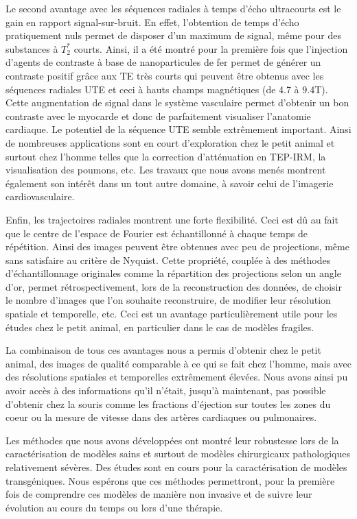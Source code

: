 Le second avantage avec les séquences radiales à temps d'écho ultracourts est le gain en rapport signal-sur-bruit. En effet, l'obtention de temps d'écho pratiquement nuls permet de disposer d'un maximum de signal, même pour des substances à $T_2^*$ courts.
Ainsi, il a été montré pour la première fois que l'injection d'agents de contraste à base de nanoparticules de fer permet de générer un contraste positif grâce aux TE très courts qui peuvent être obtenus avec les séquences radiales UTE et ceci à hauts champs magnétiques (de 4.7 à 9.4T). Cette augmentation de signal dans le système vasculaire permet d'obtenir un bon contraste avec le myocarde et donc de parfaitement visualiser l'anatomie cardiaque. 
Le potentiel de la séquence UTE semble extrêmement important. Ainsi de nombreuses applications sont en court d'exploration chez le petit animal et surtout chez l'homme telles que la correction d'atténuation en TEP-IRM, la visualisation des poumons, etc. Les travaux que nous avons menés montrent également son intérêt dans un tout autre domaine, à savoir celui de l'imagerie cardiovasculaire.

Enfin, les trajectoires radiales montrent une forte flexibilité. Ceci est dû au fait que le centre de l'espace de Fourier est échantillonné à chaque temps de répétition. Ainsi des images peuvent être obtenues avec peu de projections, même sans satisfaire au critère de Nyquist. Cette propriété, couplée à des méthodes d'échantillonnage originales comme la répartition des projections selon un angle d'or, permet rétrospectivement, lors de la reconstruction des données, de choisir le nombre d'images que l'on souhaite reconstruire, de modifier leur résolution spatiale et temporelle, etc. Ceci est un avantage particulièrement utile pour les études chez le petit animal, en particulier dans le cas de modèles fragiles.

La combinaison de tous ces avantages nous a permis d'obtenir chez le petit animal, des images de qualité comparable à ce qui se fait chez l'homme, mais avec des résolutions spatiales et temporelles extrêmement élevées. Nous avons ainsi pu avoir accès à des informations qu'il n'était, jusqu'à maintenant, pas possible d'obtenir chez la souris comme les fractions d'éjection sur toutes les zones du coeur ou la mesure de vitesse dans des artères cardiaques ou pulmonaires.

Les méthodes que nous avons développées ont montré leur robustesse lors de la caractérisation de modèles sains et surtout de modèles chirurgicaux pathologiques relativement sévères. Des études sont en cours pour la caractérisation de modèles transgéniques. Nous espérons que ces méthodes permettront, pour la première fois de comprendre ces modèles de manière non invasive et de suivre leur évolution au cours du temps ou lors d'une thérapie.

